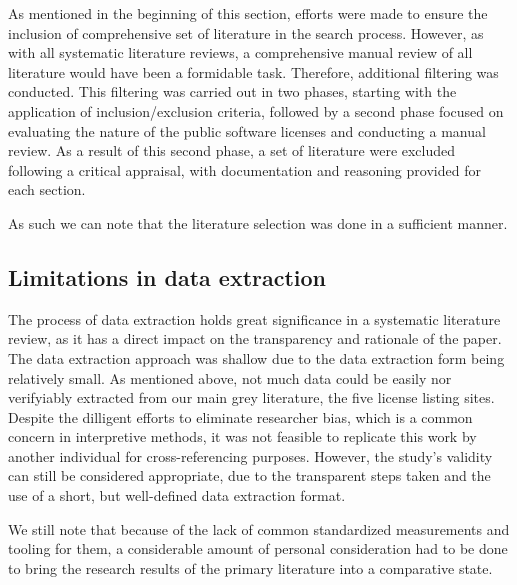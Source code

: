 As mentioned in the beginning of this section, efforts were made to ensure the inclusion of comprehensive set of literature in the search process. However, as with all systematic literature reviews, a comprehensive manual review of all literature would have been a formidable task. Therefore, additional filtering was conducted. This filtering was carried out in two phases, starting with the application of inclusion/exclusion criteria, followed by a second phase focused on evaluating the nature of the public software licenses and conducting a manual review. As a result of this second phase, a set of literature were excluded following a critical appraisal, with documentation and reasoning provided for each section.

As such we can note that the literature selection was done in a sufficient manner.

\subsection{Limitations in data extraction}
The process of data extraction holds great significance in a systematic literature review, as it has a direct impact on the transparency and rationale of the paper. The data extraction approach was shallow due to the data extraction form being relatively small. As mentioned above, not much data could be easily nor verifyiably extracted from our main grey literature, the five license listing sites. Despite the dilligent efforts to eliminate researcher bias, which is a common concern in interpretive methods, it was not feasible to replicate this work by another individual for cross-referencing purposes. However, the study's validity can still be considered appropriate, due to the transparent steps taken and the use of a short, but well-defined data extraction format.

We still note that because of the lack of common standardized measurements and tooling for them, a considerable amount of personal consideration had to be done to bring the research results of the primary literature into a comparative state.